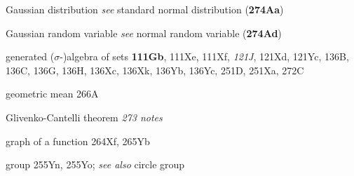 







Gaussian distribution
  {\it see} standard normal distribution ({\bf 274Aa})








Gaussian random variable {\it see} normal random variable
({\bf 274Ad})











generated ($\sigma$-\nobreak)algebra of sets {\bf 111Gb}, 111Xe, 111Xf,
{\it 121J}, 121Xd, 121Yc, 136B, 136C, 136G, 136H, 136Xc, 136Xk,
136Yb, 136Yc,
  251D, 251Xa, 272C







geometric mean 266A
















Glivenko-Cantelli theorem {\it 273 notes}



















graph of a function 264Xf, 265Yb












group 255Yn, 255Yo;
  {\it see also} circle group












